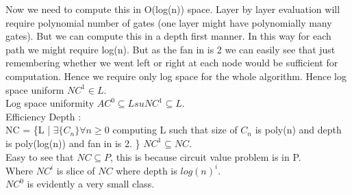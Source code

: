 \documentclass[solution,addpoints,12pt]{exam}
\begin{document}
Now we need to compute this in O(log(n)) space. Layer by layer
evaluation will require polynomial number of gates (one layer might
have polynomially many gates). But we can compute this in a
depth first manner. In this way for each path we might require
log(n). But as the fan in is 2 we can easily see that just remembering
whether we went left or right at each node would
be sufficient for computation. Hence we require only log space
for the whole algorithm. Hence log space uniform ${NC}^1 \in L$.\\

Log space uniformity ${AC}^0 \subseteq Lsu {NC}^1 \subseteq L$.\\

Efficiency Depth :\\
NC = \{L | $\exists \{C_n\} \forall n \ge 0$ computing
L such that size of $C_n$ is poly(n) and depth is poly(log(n)) and fan in is 2.
\}
${NC}^1 \subseteq NC$.\\
Easy to see that $NC \subseteq P$, this is because circuit
value problem is in P.\\
Where ${NC}^i$ is slice of $NC$ where depth is ${log(n)}^i$.\\
${NC}^0$ is evidently a very small class.\\
\end{document}
